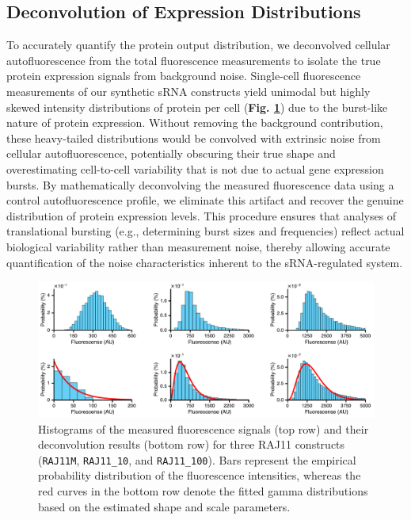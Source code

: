 
\subsection*{Deconvolution of Expression Distributions}
To accurately quantify the protein output distribution, we deconvolved cellular autofluorescence from the total fluorescence measurements to isolate the true protein expression signals from background noise. Single-cell fluorescence measurements of our synthetic sRNA constructs yield unimodal but highly skewed intensity distributions of protein per cell (\textbf{Fig. \ref{fig:figadd.1}}) due to the burst-like nature of protein expression. Without removing the background contribution, these heavy-tailed distributions would be convolved with extrinsic noise from cellular autofluorescence, potentially obscuring their true shape and overestimating cell-to-cell variability that is not due to actual gene expression bursts. By mathematically deconvolving the measured fluorescence data using a control autofluorescence profile, we eliminate this artifact and recover the genuine distribution of protein expression levels. This procedure ensures that analyses of translational bursting (e.g., determining burst sizes and frequencies) reflect actual biological variability rather than measurement noise, thereby allowing accurate quantification of the noise characteristics inherent to the sRNA-regulated system.


\begin{figure}[ht!]
    \centering
    \includegraphics[width=\linewidth]{assets/addendumFig1.pdf}
    \caption{Histograms of the measured fluorescence signals (top row) and their deconvolution results (bottom row) for three RAJ11 constructs (\texttt{RAJ11M}, \texttt{RAJ11\_10}, and \texttt{RAJ11\_100}). Bars represent the empirical probability distribution of the fluorescence intensities, whereas the red curves in the bottom row denote the fitted gamma distributions based on the estimated shape and scale parameters.}\label{fig:figadd.1}
\end{figure}

